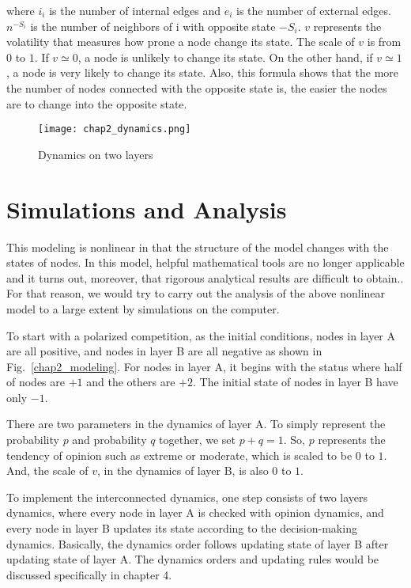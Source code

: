 where $i_i$ is the number of internal edges and $e_i$ is the number of external edges. $n^{-S_i}$ is the number of neighbors of i with opposite state $-S_i$. $v$ represents the volatility that measures how prone a node change its state. The scale of $v$ is from $0$ to $1$. If $v \simeq 0$,  a node is unlikely to change its state. On the other hand, if $v \simeq 1$, a node is very likely to change its state. Also, this formula shows that the more the number of nodes connected with the opposite state is, the easier the nodes are to change into the opposite state.\\
\begin{figure}[!htb]
	\centering
	\texttt{[image: chap2\_dynamics.png]}
	\caption{Dynamics on two layers}
	\label{chap2_dynamics}
\end{figure}


\section{Simulations and Analysis}
This modeling is nonlinear in that the structure of the model changes with the states of nodes. In this model, helpful mathematical tools are no longer applicable and  it turns out, moreover, that rigorous analytical results are difficult to obtain.\parencite{nicolas2017, rainer2002}. For that reason, we would try to carry out the analysis of the above nonlinear model to a large extent by simulations on the computer.

To start with a polarized competition, as the initial conditions,  nodes in layer A are all positive, and nodes in layer B are all negative as shown in Fig.~\ref{chap2_modeling}. For nodes in layer A, it begins with the status where half of nodes are $+1$ and the others are $+2$. The initial state of nodes in layer B have only $-1$. 

There are two parameters in the dynamics of layer A. To simply represent the probability $p$ and probability $q$ together, we set $p+q=1$. So, $p$ represents the tendency of opinion such as extreme or moderate, which is scaled to be $0$ to $1$. And, the scale of $v$, in the dynamics of layer B, is also $0$ to $1$. 

To implement the interconnected dynamics, one step consists of two layers dynamics, where every node in layer A is checked with opinion dynamics, and every node in layer B updates its state according to the decision-making dynamics. Basically, the dynamics order follows updating state of layer B after updating state of layer A. The dynamics orders and updating rules would be discussed specifically in chapter 4.      

